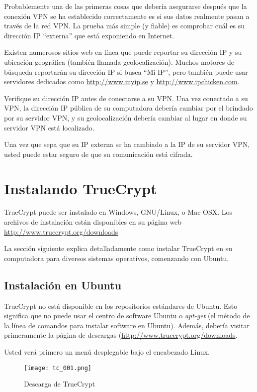 \documentclass[10pt,a5paper,twoside,,]{book}
\begin{document}
Probablemente una de las primeras cosas que debería asegurarse después
que la conexión VPN se ha establecido correctamente es si sus datos
realmente pasan a través de la red VPN. La prueba más simple (y fiable)
es comprobar cuál es su dirección IP ``externa'' que está exponiendo en
Internet.

Existen numerosos sitios web en línea que puede reportar su dirección IP
y su ubicación geográfica (también llamada geolocalización). Muchos
motores de búsqueda reportarán su dirección IP si busca ``Mi IP'', pero
también puede usar servidores dedicados como \url{http://www.myip.se} y
\href{http://ipchicken.com}{http://www.ipchicken.com}.

Verifique su dirección IP antes de conectarse a su VPN. Una vez
conectado a su VPN, la dirección IP pública de su computadora debería
cambiar por el brindado por su servidor VPN, y su geolocalización
debería cambiar al lugar en donde su servidor VPN está localizado.

Una vez que sepa que su IP externa se ha cambiado a la IP de su servidor
VPN, usted puede estar seguro de que su comunicación está cifrada.

\chapter{Instalando TrueCrypt}\label{instalando-truecrypt}

TrueCrypt puede ser instalado en Windows, GNU/Linux, o Mac OSX. Los
archivos de instalación están disponibles en su página web
\url{http://www.truecrypt.org/downloads}

La sección siguiente explica detalladamente como instalar TrueCrypt en
su computadora para diversos sistemas operativos, comenzando con Ubuntu.

\section{Instalación en Ubuntu}\label{instalaciuxf3n-en-ubuntu}

TrueCrypt no está disponible en los repositorios estándares de Ubuntu.
Esto significa que no puede usar el centro de software Ubuntu o
\emph{apt-get} (el método de la línea de comandos para instalar software
en Ubuntu). Además, debería visitar primeramente la página de descargas
(\url{http://www.truecrypt.org/downloads}.

Usted verá primero un menú desplegable bajo el encabezado Linux.

\begin{figure}[htbp]
\centering
\texttt{[image: tc\_001.png]}
\caption{Descarga de TrueCrypt}
\end{figure}
\end{document}
